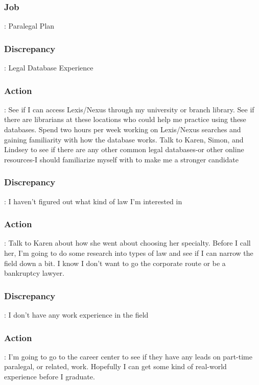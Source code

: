 \subsubsection*{Job}: Paralegal Plan

\subsubsection*{Discrepancy}: Legal Database Experience

\subsubsection*{Action}: See if I can access Lexis/Nexus through my university or branch library. See if there are librarians at these locations who could help me practice using these databases. Spend two hours per week working on Lexis/Nexus searches and gaining familiarity with how the database works. Talk to Karen, Simon, and Lindsey to see if there are any other common legal databases-or other online resources-I should familiarize myself with to make me a stronger candidate

\subsubsection*{Discrepancy}: I haven't figured out what kind of law I'm interested in

\subsubsection*{Action}: Talk to Karen about how she went about choosing her specialty. Before I call her, I'm going to do some research into types of law and see if I can narrow the field down a bit. I know I don't want to go the corporate route or be a bankruptcy lawyer.

\subsubsection*{Discrepancy}: I don't have any work experience in the field

\subsubsection*{Action}: I'm going to go to the career center to see if they have any leads on part-time paralegal, or related, work. Hopefully I can get some kind of real-world experience before I graduate.

